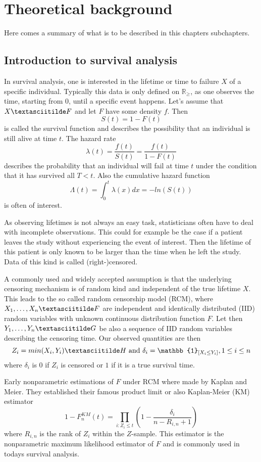 \chapter{Theoretical background}

Here comes a summary of what is to be described in this chapters subchapters.

\section{Introduction to survival analysis}

In survival analysis, one is interested in the lifetime or time to failure $X$ of a specific individual. Typically this data is only defined on $\mathbb{R}_{\geq}$, as one observes the time, starting from 0, until a specific event happens. Let's assume that $X \textasciitilde F$ and let $F$ have some density $f$. Then
\[
S(t) = 1 - F(t)
\]
is called the survival function and describes the possibility that an individual is still alive at time $t$. The hazard rate 
\[
\lambda(t) = \frac{f(t)}{S(t)} = \frac{f(t)}{1-F(t)}
\]
describes the probability that an individual will fail at time $t$ under the condition that it has survived all $T<t$.
Also the cumulative hazard function 
\[
\Lambda(t) = \int_{0}^{t}\lambda(x)dx = -ln(S(t))
\]
is often of interest.

As observing lifetimes is not always an easy task, statisticians often have to deal with incomplete observations. This could for example be the case if a patient leaves the study without experiencing the event of interest. Then the lifetime of this patient is only known to be larger than the time when he left the study. Data of this kind is called (right-)censored.

A commonly used and widely accepted assumption is that the underlying censoring mechanism is of random kind and independent of the true lifetime $X$.
This leads to the so called random censorship model (RCM), where $X_1,\ldots ,X_n \textasciitilde F$ are independent and identically distributed (IID) random variables with unknown continuous distribution function $F$. Let then $Y_1,\ldots ,Y_n \textasciitilde G$ be also a sequence of IID random variables describing the censoring time. Our observed quantities are then
\[
Z_i = min(X_i,Y_i) \textasciitilde H \text{ and } \delta_i = \mathbb{1}_{[X_i\leq Y_i]}, 1 \leq i \leq n
\]
where $\delta_i$ is $0$ if $Z_i$ is censored or $1$ if it is a true survival time.

Early nonparametric estimations of $F$ under RCM where made by Kaplan and Meier\cite{KAPLANMEIER}. They established their famous product limit or also Kaplan-Meier (KM) estimator 
\begin{equation}\label{fnkm}
1-F_n^{KM}(t) =  \prod_{i:Z_i \leq t} \left( 1 - \frac{\delta_i}{n-R_{i,n} + 1} \right)
\end{equation}
where $R_{i,n}$ is the rank of $Z_i$ within the $Z$-sample. This estimator is the nonparametric maximum likelihood estimator of $F$ and is commonly used in todays survival analysis.



